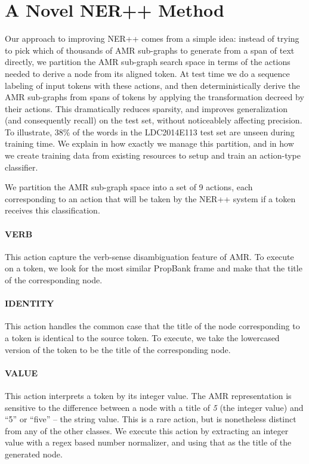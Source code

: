 \documentclass[11pt]{article}
\newcommand\n[1]{\textit{#1}} %
\begin{document}
\section{A Novel NER++ Method}\label{sec:nerplusplus}
Our approach to improving NER++ comes from a simple idea: instead of trying to pick 
  which of thousands of AMR sub-graphs to generate from a span of text directly, 
  we partition the AMR sub-graph search space in terms of the actions needed to 
  derive a node from its aligned token. 
At test time we do a sequence labeling of input tokens with these actions, and 
  then deterministically derive the AMR sub-graphs from spans of tokens by applying 
  the transformation decreed by their actions. 
This dramatically reduces sparsity, and improves generalization (and consequently
  recall) on the test set, without noticeablely affecting precision.
To illustrate, 38\% of the words in the LDC2014E113 test set are 
  unseen during training time.
We explain in  how exactly we manage this partition, and in  how we create training data from existing resources to setup and train an action-type classifier.


We partition the AMR sub-graph space into a set of 9 actions, each corresponding to an action that will be taken by the NER++ system if a token receives this classification.

\paragraph{VERB} This action capture the verb-sense disambiguation feature of AMR. To execute on a token, we look for the most similar PropBank frame and make that the title of the corresponding node.

\paragraph{IDENTITY} This action handles the common case that the title of the node corresponding to a token is identical to the source token. To execute, we take the lowercased version of the token to be the title of the corresponding node.

\paragraph{VALUE} This action interprets a token by its integer value. 
The AMR representation is sensitive to the difference between a node with a title
  of \n{5} (the integer value) and ``5'' or ``five'' -- the string value.
This is a rare action, but is nonetheless distinct from any of the other classes.
We execute this action by extracting an integer value with a regex based number normalizer, and using that as the title of the generated node.
\end{document}
